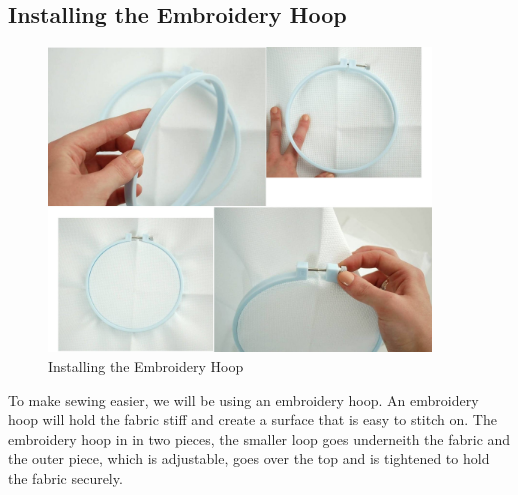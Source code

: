 \documentclass[letterpaper,twoside,12pt]{article}
\begin{document}
\subsection{Installing the Embroidery Hoop}
\begin{figure}[hbpt]\begin{centering}%
\includegraphics[width=4in]{InstallEmbroideryHoop.jpg}
\caption{Installing the Embroidery Hoop}
\label{fig:installembroideryhoop}
\end{centering}\end{figure}
To make sewing easier, we will be using an embroidery hoop.  An embroidery 
hoop will hold the fabric stiff and create a surface that is easy to stitch
on.  The embroidery hoop in in two pieces, the smaller loop goes underneith 
the fabric and the outer piece, which is adjustable, goes over the top and is 
tightened to hold the fabric securely.
\end{document}

